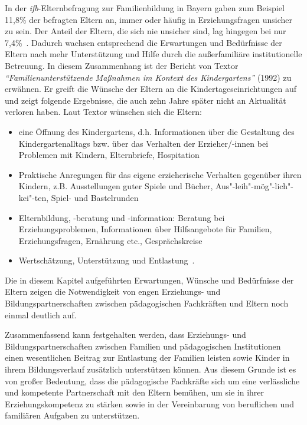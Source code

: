 \documentclass[12pt,a4paper]{article}
\begin{document}
	In der \textit{ifb}-Elternbefragung zur Familienbildung in Bayern gaben zum Beispiel 11,8\% der befragten Eltern an, immer oder häufig in Erziehungsfragen unsicher zu sein. Der Anteil der Eltern, die sich nie unsicher sind, lag hingegen bei nur 7,4\%~\parencite[S.~22]{Muehling}. Dadurch wachsen entsprechend die Erwartungen und Bedürfnisse der Eltern nach mehr Unterstützung und Hilfe durch die außerfamiliäre institutionelle Betreuung. In diesem Zusammenhang ist der  Bericht von Textor \textit{"`Familienunterstützende Maßnahmen im Kontext des Kindergartens"'} (1992) zu erwähnen. Er greift die Wünsche der Eltern an die Kindertageseinrichtungen  auf und zeigt folgende Ergebnisse, die auch zehn Jahre später nicht an Aktualität verloren haben. Laut Textor wünschen sich die Eltern:
	\begin{itemize}
\item eine Öffnung des Kindergartens, d.h. Informationen über die Gestaltung des Kindergartenalltags bzw. über das Verhalten der Erzieher/-innen bei Problemen mit Kindern, Elternbriefe, Hospitation
 \item Praktische Anregungen für das eigene erzieherische Verhalten gegenüber ihren Kindern, z.B. Ausstellungen guter Spiele und Bücher, Aus"-leih"-mög"-lich"-kei"-ten, Spiel- und Bastelrunden
 \item Elternbildung, -beratung und -information: Beratung bei Erziehungsproblemen, Informationen  über Hilfsangebote für Familien, Erziehungsfragen, Ernährung  etc., Gesprächskreise
 \item Wertschätzung, Unterstützung und Entlastung~\parencite[S.~64-65]{Textor_1992}.
 \end{itemize}
 
Die in diesem Kapitel aufgeführten Erwartungen, Wünsche und Bedürfnisse der Eltern zeigen die Notwendigkeit von engen Erziehungs- und Bildungspartnerschaften zwischen pädagogischen Fachkräften und Eltern noch einmal deutlich auf.

	Zusammenfassend kann festgehalten werden, dass Erziehungs- und Bildungspartnerschaften zwischen Familien und pädagogischen Institutionen einen wesentlichen Beitrag zur Entlastung der Familien leisten sowie Kinder in ihrem Bildungsverlauf zusätzlich unterstützen können. Aus diesem Grunde ist es von großer Bedeutung, dass die pädagogische Fachkräfte sich um eine verlässliche und kompetente Partnerschaft mit den Eltern bemühen, um sie in ihrer Erziehungskompetenz zu stärken sowie in der Vereinbarung von beruflichen und familiären Aufgaben zu unterstützen.
\end{document}
